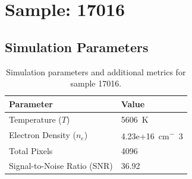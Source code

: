 \documentclass[a4paper,11pt]{article}
\begin{document}
\clearpage

\section{Sample: 17016}
\subsection{Simulation Parameters}
\begin{table}[h!]
    \centering
    \begin{tabular}{ll}
        \toprule
        \textbf{Parameter} & \textbf{Value} \\
        \midrule
        Temperature ($T$) & 5606 \,\si{K} \\
        Electron Density ($n_e$) & 4.23e+16 \,\si{cm^-3} \\
        Total Pixels & 4096 \\
        Signal-to-Noise Ratio (SNR) & 36.92 \\
        \bottomrule
    \end{tabular}
    \caption{Simulation parameters and additional metrics for sample 17016.}
    \label{tab:params_17016}
\end{table}
\end{document}
